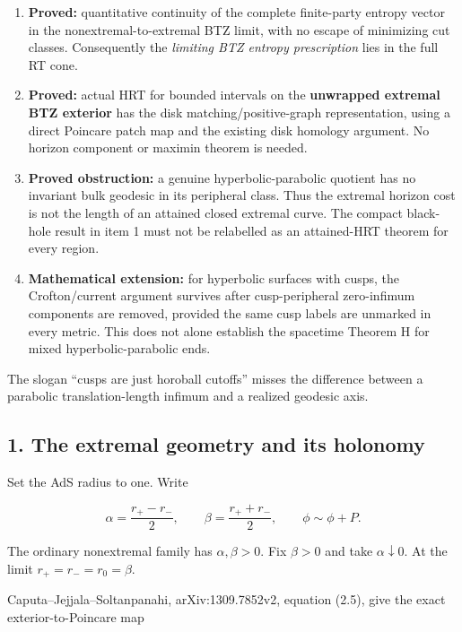 \documentclass[11pt]{article}
\providecommand{\tightlist}{\setlength{\itemsep}{1pt}\setlength{\parskip}{0pt}}
\begin{document}
\begin{enumerate}
\def\labelenumi{\arabic{enumi}.}
\tightlist
\item
  \textbf{Proved:} quantitative continuity of the complete finite-party
  entropy vector in the nonextremal-to-extremal BTZ limit, with no
  escape of minimizing cut classes. Consequently the \emph{limiting BTZ
  entropy prescription} lies in the full RT cone.
\item
  \textbf{Proved:} actual HRT for bounded intervals on the
  \textbf{unwrapped extremal BTZ exterior} has the disk
  matching/positive-graph representation, using a direct Poincare patch
  map and the existing disk homology argument. No horizon component or
  maximin theorem is needed.
\item
  \textbf{Proved obstruction:} a genuine hyperbolic-parabolic quotient
  has no invariant bulk geodesic in its peripheral class. Thus the
  extremal horizon cost is not the length of an attained closed extremal
  curve. The compact black-hole result in item 1 must not be relabelled
  as an attained-HRT theorem for every region.
\item
  \textbf{Mathematical extension:} for hyperbolic surfaces with cusps,
  the Crofton/current argument survives after cusp-peripheral
  zero-infimum components are removed, provided the same cusp labels are
  unmarked in every metric. This does not alone establish the spacetime
  Theorem H for mixed hyperbolic-parabolic ends.
\end{enumerate}

The slogan ``cusps are just horoball cutoffs'' misses the difference
between a parabolic translation-length infimum and a realized geodesic
axis.

\subsection{1. The extremal geometry and its
holonomy}\label{the-extremal-geometry-and-its-holonomy}

Set the AdS radius to one. Write

\[
\alpha=\frac{r_+-r_-}{2},\qquad
\beta=\frac{r_++r_-}{2},\qquad \phi\sim\phi+P.
\]

The ordinary nonextremal family has \(\alpha,\beta>0\). Fix \(\beta>0\)
and take \(\alpha\downarrow0\). At the limit \(r_+=r_-=r_0=\beta\).

Caputa--Jejjala--Soltanpanahi, arXiv:1309.7852v2, equation (2.5), give
the exact exterior-to-Poincare map
\end{document}

